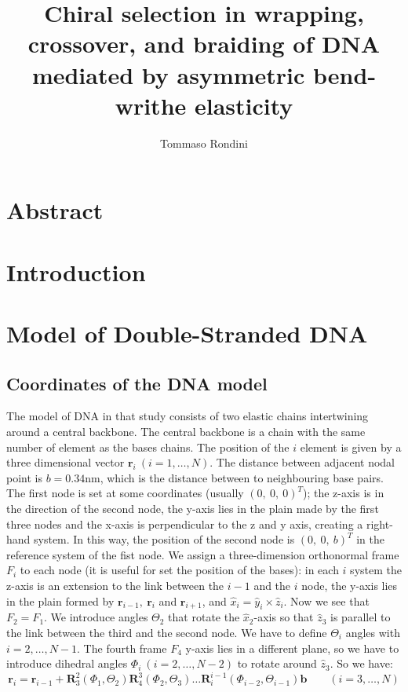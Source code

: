 \documentclass[a4paper,10pt]{article}
\title{Chiral selection in wrapping, crossover, and braiding of DNA mediated by asymmetric bend-writhe elasticity}
\author{Tommaso Rondini}
\begin{document}
\maketitle

\section*{Abstract}

\section{Introduction}

\section{Model of Double-Stranded DNA}
\subsection{Coordinates of the DNA model}
The model of DNA in that study consists of two elastic chains intertwining around a central backbone.
The central backbone is a chain with the same number of element as the bases chains.
The position of the $i$ element is given by a three dimensional vector $\textbf{r}_i \ \left(i=1,\dots ,N\right)$.
The distance between adjacent nodal point is $b = 0.34$\si{\nm}, which is the distance between to neighbouring base pairs.
The first node is set at some coordinates (usually $(0,\ 0,\ 0)^T$);
the z-axis is in the direction of the second node, the y-axis lies in the plain made by the first three nodes and the x-axis is perpendicular to the z and y axis, creating a right-hand system.
In this way, the position of the second node is $(0,\ 0,\ b)^T$ in the reference system of the fist node.
We assign a three-dimension orthonormal frame $F_i$ to each node (it is useful for set the position of the bases): in each $i$ system the z-axis is an extension to the link between the $i-1$ and the $i$ node, the y-axis lies in the plain formed by $\textbf{r}_{i-1},\ \textbf{r}_i$ and $\textbf{r}_{i+1}$, and $\hat{x}_i=\hat{y}_i\times\hat{z}_i$.
Now we see that $F_2=F_1$.
We introduce angles $\Theta_2$ that rotate the $\hat{x}_2$-axis so that $\hat{z}_3$ is parallel to the link between the third and the second node.
We have to define $\Theta_i$ angles with $i=2,\dots,N-1$.
The fourth frame $F_4$ y-axis lies in a different plane, so we have to introduce dihedral angles $\Phi_i\ (i=2,\dots,N-2)$ to rotate around $\hat{z}_3$.
So we have:
\begin{equation}\label{eq:c_coo}
\textbf{r}_i=\textbf{r}_{i-1}+\textbf{R}^{2}_{3}\left(\Phi_1,\Theta_2\right)\textbf{R}^{3}_{4}\left(\Phi_2,\Theta_3\right)\dots\textbf{R}^{i-1}_{i}\left(\Phi_{i-2},\Theta_{i-1}\right)\textbf{b}\qquad (i=3,\dots,N)
\end{equation}
\end{document}
